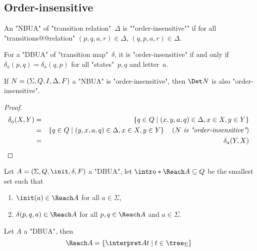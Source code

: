 \documentclass{article}
\begin{document}
\subsection{Order-insensitive}

\begin{definition}
	An "NBUA" of "transition relation"~$\Delta$ is ""order-insensitive"" if for all "transitions@@relation" $(p,q,a,r) \in \Delta$,
	$(q,p,a,r) \in \Delta$.
\end{definition}

\begin{remark}
	For a "DBUA" of "transition map"~$\delta$, it is "order-insensitive" if and only if
	$\delta_a (p,q) = \delta_a (q,p)$ for all "states"~$p,q$ and letter~$a$.
\end{remark}

\begin{lemma}
	If $N = (\Sigma, Q, I, \Delta, F)$ a "NBUA" is "order-insensitive", then $\Det N$ is also "order-insensitive".
\end{lemma}

\begin{proof}
	\begin{eqnarray*}
		\delta_a (X,Y) &=& \left\{q \in Q \mid (x,y,a,q) \in \Delta, x \in X, y \in Y\right\} \\
		&=& \left\{q \in Q \mid (y,x,a,q) \in \Delta, x \in X, y \in Y\right\}  \quad\left(\textit{$N$ is "order-insensitive"}\right) \\
		&=& \delta_a (Y,X)
	\end{eqnarray*}
\end{proof}

\begin{definition}
	Let $A = \DBUA$ a "DBUA", let $\intro* \Reach A \subseteq Q$ be the smallest set such that
	\begin{enumerate}
		\item $\init (a) \in \Reach A$ for all $a \in \Sigma$,
		\item $\delta (p,q,a) \in \Reach A$ for all $p,q \in \Reach A$ and $a \in \Sigma$.
	\end{enumerate}
\end{definition}


\begin{lemma}
	Let $A$ a "DBUA", then
	\[\Reach A = \setdef {\interpret A t} {t \in \tree_\Sigma} \]
\end{lemma}
\end{document}
